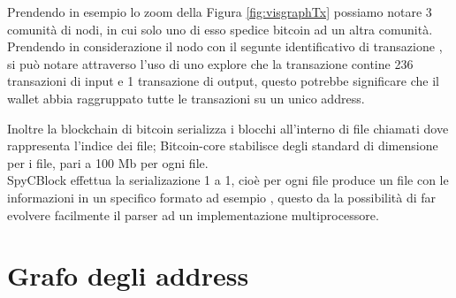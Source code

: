 \begin{example}
  Prendendo in esempio lo zoom  della Figura \ref{fig:visgraphTx} possiamo notare 3 comunità di nodi, in cui solo uno di esso spedice bitcoin ad un altra comunità.\\
  Prendendo in considerazione il nodo con il segunte identificativo di transazione , si può notare attraverso l'uso di uno explore che la transazione contine 236 transazioni di input e 1 transazione di output, questo potrebbe significare che il wallet abbia raggruppato tutte le transazioni su un unico address.
\end{example}

Inoltre la blockchain di bitcoin serializza i blocchi all'interno di file chiamati  dove  rappresenta l'indice dei file; Bitcoin-core stabilisce degli standard di dimensione per i file, pari a 100 Mb per ogni file.\\
SpyCBlock effettua la serializazione 1 a 1, cioè per ogni file  produce un file con le informazioni in un specifico formato ad esempio , questo da la possibilità di far evolvere facilmente il parser ad un implementazione multiprocessore.

\section{Grafo degli address} \label{sec:solGraphAddress}

